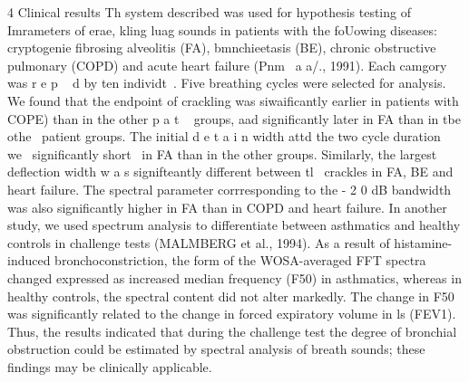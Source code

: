 4 Clinical results
Th system described was used for hypothesis testing of
Imrameters of erae,
kling luag sounds in patients with the
foUowing diseases: cryptogenie fibrosing alveolitis (FA),
bmnchieetasis (BE), chronic obstructive pulmonary
(COPD) and acute heart failure (Pnm~ a a/., 1991). Each
camgory was r e p ~ d
by ten individt~. Five breathing
cycles were selected for analysis. We found that the endpoint of
crackling was siwaificantly earlier in patients with COPE) than
in the other p a t ~ groups, aad significantly later in FA than in
tbe othe~ patient groups. The initial d e t a i n width attd the
two cycle duration we~ significantly short~ in FA than in the
other groups. Similarly, the largest deflection width w a s
signifteantly different between tl~ crackles in FA, BE and
heart failure. The spectral parameter corrresponding to the
- 2 0 dB bandwidth was also significantly higher in FA than in
COPD and heart failure.
In another study, we used spectrum analysis to differentiate
between asthmatics and healthy controls in challenge tests
(MALMBERG et al., 1994). As a result of histamine-induced
bronchoconstriction, the form of the WOSA-averaged FFT
spectra changed expressed as increased median frequency
(F50) in asthmatics, whereas in healthy controls, the spectral
content did not alter markedly. The change in F50 was
significantly related to the change in forced expiratory volume
in ls (FEV1). Thus, the results indicated that during the
challenge test the degree of bronchial obstruction could be
estimated by spectral analysis of breath sounds; these findings
may be clinically applicable.


